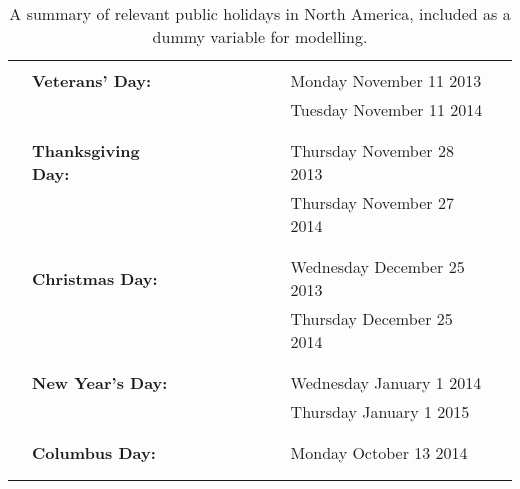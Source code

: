 \documentclass{article}
\begin{document}
\begin{table}
\begin{tabular}{llllllllll}
\hline
 &  &  &  &  &  &  &  &  & \\
 & \textbf{Veterans' Day:} &  &  &  &  &  &  & Monday November 11 2013 & \\
 &  &  &  &  &  &  &  & Tuesday November 11 2014 & \\
 &  &  &  &  &  &  &  &  & \\
\hline
 &  &  &  &  &  &  &  &  & \\
 & \textbf{Thanksgiving Day:} &  &  &  &  &  &  & Thursday November 28 2013 & \\
 &  &  &  &  &  &  &  & Thursday November 27 2014 & \\
 &  &  &  &  &  &  &  &  & \\
\hline
 &  &  &  &  &  &  &  &  & \\
 & \textbf{Christmas Day:} &  &  &  &  &  &  & Wednesday December 25 2013 & \\
 &  &  &  &  &  &  &  & Thursday December 25 2014 & \\
 &  &  &  &  &  &  &  &  & \\
\hline
 &  &  &  &  &  &  &  &  & \\
 & \textbf{New Year's Day:} &  &  &  &  &  &  & Wednesday January 1 2014 & \\
 &  &  &  &  &  &  &  & Thursday January 1 2015 & \\
 &  &  &  &  &  &  &  &  & \\
\hline
 &  &  &  &  &  &  &  &  & \\
 & \textbf{Columbus Day:} &  &  &  &  &  &  & Monday October 13 2014 & \\
 &  &  &  &  &  &  &  &  & \\
\hline
 &  &  &  &  &  &  &  &  & \\
\end{tabular}\caption[A summary of public holidays included as a dummy variable]{\label{tab:public-holidays}A summary of relevant public holidays in North America, included as a dummy variable for modelling.}

\end{table}

\pagebreak

\pagebreak



\end{document}
